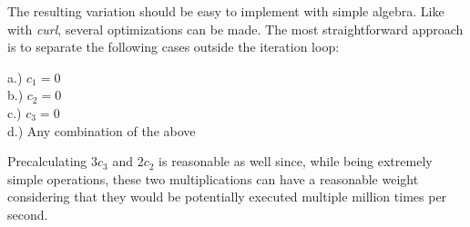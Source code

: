 \documentclass[]{article}
\begin{document}
The resulting variation should be easy to implement with simple algebra. Like with \emph{curl}, several optimizations can be made. The most straightforward approach is to separate the following cases outside the iteration loop:

\begin{flushleft}
	\hspace{20pt} a.) $c_1 = 0$ \\	
	\hspace{20pt} b.) $c_2 = 0$ \\
	\hspace{20pt} c.) $c_3 = 0$ \\
	\hspace{20pt} d.) Any combination of the above \\
\end{flushleft}	

\noindent Precalculating $3c_3$ and $2c_2$ is reasonable as well since, while being extremely simple operations, these two multiplications can have a reasonable weight considering that they would be potentially executed multiple million times per second.
\end{document}
